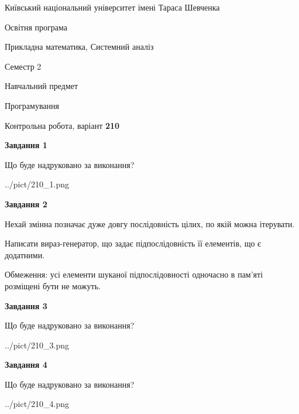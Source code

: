 \documentclass[12pt, ukrainian]{article}
\begin{document}
{{\begin {small}\par
{ \center  Київський національний університет імені Тараса Шевченка \par}
{\parbox {5 cm}{Освітня програма \hfill}{\parbox {8 cm}{Прикладна математика, Системний аналіз \hfill}}\parbox {5 cm}{\hfill Семестр 2}}\par
{\parbox {5 cm} {Навчальний предмет \hfill}\parbox {7 cm}{Програмування \hfill}\parbox {6cm}{\hfill}\par}\vspace{-7pt} \end{small}}{\center Контрольна робота, варіант  \No \textbf
{ 210 }\par}}
{
\begin {large}
{\begin {center}\textbf{Завдання 1}\end {center}}\par
Що буде надруковано за виконання?\par\par
\begin{center}
	{../pict/210_1.png}
\end{center}
\newpage

{\begin {center}\textbf{Завдання 2}\end {center}}\par
Нехай змінна  позначає дуже довгу послідовність цілих, по якій можна ітерувати.

Написати вираз-генератор, що задає підпослідовність її елементів, що є додатни\-ми.

Обмеження: усі елементи шуканої підпослідовності одночасно в пам'яті розміщені бути не можуть.\par
\newpage

{\begin {center}\textbf{Завдання 3}\end {center}}\par
Що буде надруковано за виконання?\par
\begin{center}
	{../pict/210_3.png}
\end{center}
\newpage

{\begin {center}\textbf{Завдання 4}\end {center}}\par
Що буде надруковано за виконання?\par
\begin{center}
	{../pict/210_4.png}
\end{center}
\newpage


\end{large}}
\end{document}
